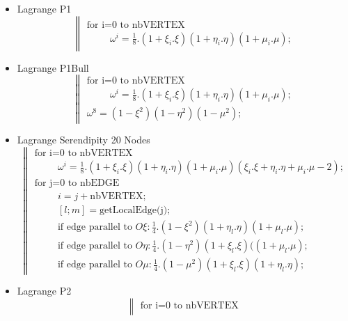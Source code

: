 \documentclass[a4paper,10pt]{article}
\begin{document}
\begin{itemize}
\item Lagrange P1
    \[
    \left\|
    \begin{array}{l}
    \text{for i=0 to nbVERTEX} \\ 
    \hspace{1cm} \omega^i = \frac{1}{8}. (1 + \xi_i .\xi)(1 + \eta_i .\eta)(1 +\mu_i .\mu ) ;
    \end{array}
    \right.
    \]
\item Lagrange P1Bull
    \[
    \left\|
    \begin{array}{l}
    \text{for i=0 to nbVERTEX} \\ 
    \hspace{1cm} \omega^i = \frac{1}{8}. (1 + \xi_i .\xi)(1 + \eta_i .\eta)(1 +\mu_i .\mu ) ; \\
    \omega^8 = (1 - \xi^2)(1 - \eta^2)(1 -\mu^2 ) ;
    \end{array}
    \right.
    \]
\item Lagrange Serendipity 20 Nodes
    \[
    \left\|
    \begin{array}{l}
    \text{for i=0 to nbVERTEX} \\ 
    \hspace{1cm} \omega^i = \frac{1}{8}. (1 + \xi_i .\xi)(1 + \eta_i .\eta)(1 +\mu_i .\mu )(\xi_i .\xi + \eta_i .\eta + \mu_i .\mu -2) ; \\
    \text{for j=0 to nbEDGE} \\
    \hspace{1cm}  i=j+\text{nbVERTEX};  \\
    \hspace{1cm}  [l;m]=\text{getLocalEdge(j)};  \\
    \hspace{1cm}  \text{if edge parallel to } O\xi  : \frac{1}{4}.(1 - \xi^2)(1 + \eta_l .\eta)(1 +\mu_l .\mu ) ; \\
    \hspace{1cm}  \text{if edge parallel to } O\eta : \frac{1}{4}.(1 - \eta^2)(1 + \xi_l .\xi)((1 +\mu_l .\mu ) ; \\
    \hspace{1cm}  \text{if edge parallel to } O\mu  : \frac{1}{4}.(1 -\mu^2 )(1 + \xi_l .\xi)(1 + \eta_l .\eta) ; 
    \end{array}
    \right.
    \]
\item Lagrange P2
    \[
    \left\|
    \begin{array}{l}
    \text{for i=0 to nbVERTEX} \\ 

\end{array}\]
\end{itemize}
\end{document}
